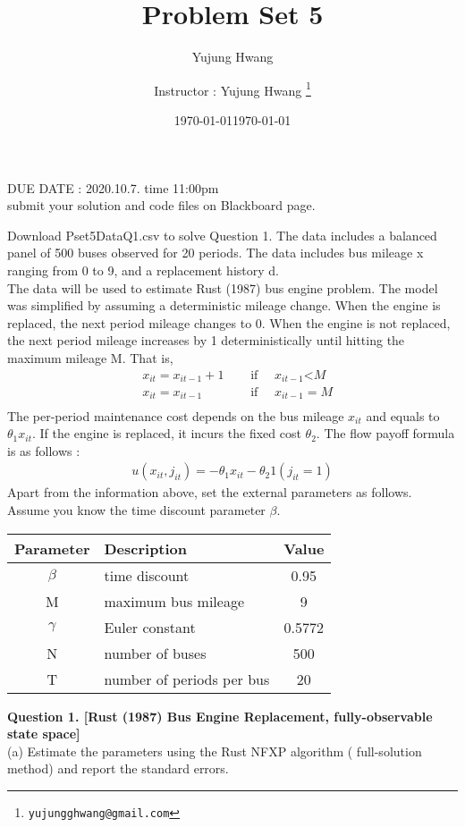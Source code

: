 \documentclass[paper=a4, fontsize=13pt]{extarticle} %
\author{Yujung Hwang} %
\date{\today} %
\numberwithin{equation}{section} %
\numberwithin{figure}{section} %
\numberwithin{table}{section} %
\begin{document}
\title{	
\normalfont \normalsize 
\huge Problem Set 5
}
\author{
Instructor : Yujung Hwang \thanks{\texttt{yujungghwang@gmail.com}}} %
\date{\today} %
\maketitle %

\begin{center}
DUE DATE : 2020.10.7. time 11:00pm \\
submit your solution and code files on Blackboard page.
\end{center}

\upshape \mdseries 
\normalsize

Download Pset5DataQ1.csv to solve Question 1. The data includes a balanced panel of 500 buses observed for 20 periods. The data includes bus mileage x ranging from 0 to 9, and a replacement history d. \\
The data will be used to estimate Rust (1987) bus engine problem. The model was simplified by assuming a deterministic mileage change. When the engine is replaced, the next period mileage changes to 0. When the engine is not replaced, the next period mileage increases by 1 deterministically until hitting the maximum mileage M. That is,
\begin{eqnarray*}
& x_{it} = x_{it-1} + 1 \quad & \mbox{ if } \quad x_{it-1} \mbox{<} M \\
& x_{it} = x_{it-1} \quad & \mbox{ if } \quad x_{it-1} = M \\
\end{eqnarray*}
The per-period maintenance cost depends on the bus mileage $x_{it}$ and equals to $\theta_1 x_{it}$. If the engine is replaced, it incurs the fixed cost $\theta_2$. The flow payoff formula is as follows : 
\begin{gather}
u(x_{it}, j_{it}) = -\theta_1 x_{it} - \theta_2 1(j_{it}=1)
\end{gather}
Apart from the information above, set the external parameters as follows. Assume you know the time discount parameter $\beta$.
\begin{table}[H]
\centering
\begin{tabular}{c L{5cm} c}
\hline
Parameter & Description & Value \\
\hline
$\beta$ & time discount & 0.95 \\
M & maximum bus mileage & 9 \\
$\gamma$ & Euler constant & 0.5772 \\
N & number of buses & 500 \\
T & number of periods per bus & 20 \\
\hline
\end{tabular}
\end{table}
\textbf{Question 1. [Rust (1987) Bus Engine Replacement, fully-observable state space]} \\
(a) Estimate the parameters using the Rust NFXP algorithm ( full-solution method) and report the standard errors. \\
\end{document}
